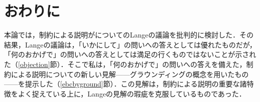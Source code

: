 \documentclass[dvipdfmx,twoside,11pt,uplatex]{jsarticle}
\theoremstyle{definition}
\begin{document}





\section{おわりに}
本論では，制約による説明がについてのLangeの議論を批判的に検討した．その結果，Langeの議論は，「いかにして」の問いへの答えとしては優れたものだが，「何のおかげで」の問いへの答えとしては満足の行くものではないことが示された（\ref{objection}節）．そこで私は，「何のおかげで」の問いへの答えを備えた，制約による説明についての新しい見解------グラウンディングの概念を用いたもの------を提示した（\ref{ebcbyground}節）．この見解は，制約による説明の重要な諸特徴をよく捉えている上に，Langeの見解の瑕疵を克服しているものであった．
\end{document}
